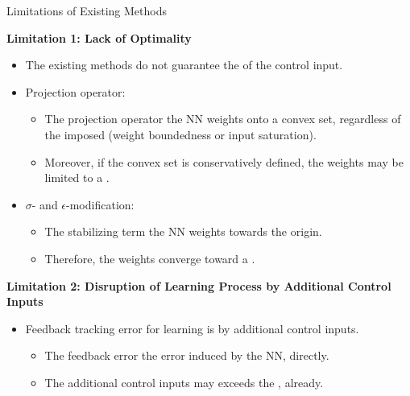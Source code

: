 \documentclass[8pt, aspectratio=169, handout]{beamer}
\newcommand{\ctxt}[2]{\color{#1}{#2}\color{black}}
\begin{document}
\begin{frame}{\insertsubsectionhead}{Limitations of Existing Methods}

  {
    \textbf{Limitation 1: Lack of Optimality}
  }
  \begin{itemize}
    \item<2-> The existing methods do not guarantee the \ctxt{airforceblue}{optimality } of the control input.
    \item<3-> Projection operator:
    \begin{itemize}
      \item The projection operator \ctxt{awesome}{simply projects } the NN weights onto a convex set, regardless of the imposed \ctxt{airforceblue}{constraints } (\eg weight boundedness or input saturation).
      \item Moreover, if the convex set is conservatively defined, the weights may be limited to a \ctxt{awesome}{suboptimal region}.
    \end{itemize}
    \item<4-> $\sigma$- and $\epsilon$-modification:
    \begin{itemize}
      \item The stabilizing term \ctxt{awesome}{biases } the NN weights towards the origin.
      \item Therefore, the weights converge toward a \ctxt{awesome}{suboptimal point}.
    \end{itemize}
  \end{itemize}

  {
    \textbf{Limitation 2: Disruption of Learning Process by Additional Control Inputs}
  }
  \begin{itemize}
    \item<5-> Feedback tracking error for learning is \ctxt{awesome}{disrupted } by additional control inputs.
      \begin{itemize}
        \item The feedback error \ctxt{airforceblue}{does not reflect } the error induced by the NN, directly.
        \item The additional control inputs may exceeds the \ctxt{awesome}{input saturation limits }, already.
    \end{itemize}  
  \end{itemize}

\end{frame}
\end{document}
